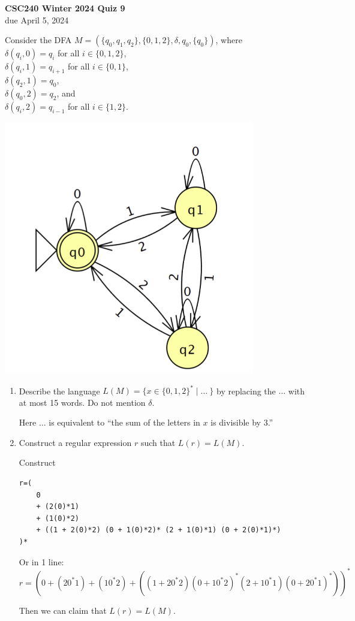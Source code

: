 \documentclass[11pt]{article}
\begin{document}
\begin{center}
{\bf \Large \bf CSC240 Winter 2024 Quiz 9}\\
due April 5, 2024
\end{center}
Consider the DFA $M=(\{ q_0,q_1, q_2\}, \{0,1,2\}, \delta, q_0, \{q_0\})$, where\\
$\delta(q_i , 0 ) = q_i$ for all $i \in \{0,1,2\}$,\\
$\delta(q_i , 1 ) = q_{i+1}$ for all $i \in \{0,1\}$,\\
$\delta(q_2 , 1 ) = q_0$,\\
$\delta(q_0 , 2 ) = q_2$, and\\
$\delta(q_i , 2 ) = q_{i-1}$ for all $i \in \{1,2\}$.

\includegraphics[scale=0.5]{img/2024-04-05-01-14-32.png}

\begin{enumerate}
\item
Describe the language $ L(M)= \{ x \in \{0,1,2\}^* \mid \ldots\ \}$ by replacing
the $\ldots$ with at most 15 words.
Do not mention $\delta$.

Here $\ldots$ is equivalent to ``the sum of the letters in $x$ is divisible by 3.''


\item
Construct a regular expression $r$ such that $L(r) = L(M)$.

Construct 
\begin{verbatim}
r=(
    0
    + (2(0)*1)
    + (1(0)*2)
    + ((1 + 2(0)*2) (0 + 1(0)*2)* (2 + 1(0)*1) (0 + 2(0)*1)*)
)*
\end{verbatim}

Or in 1 line: $r=(0 + (20^*1) + (10^*2) + ((1 + 20^*2) (0 + 10^*2)^* (2 + 10^*1) (0 + 20^*1)^*))^*$

Then we can claim that $L(r)=L(M)$.


\end{enumerate}
\end{document}
